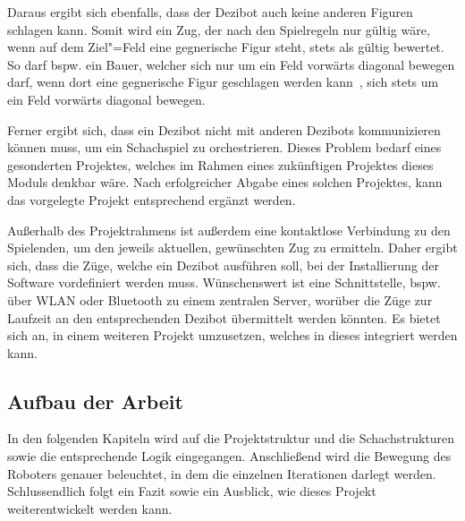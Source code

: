 
Daraus ergibt sich ebenfalls, dass der Dezibot auch keine anderen Figuren schlagen kann. Somit wird ein Zug, der nach den Spielregeln nur gültig wäre, wenn auf dem Ziel"=Feld eine gegnerische Figur steht, stets als gültig bewertet. So darf bspw. ein Bauer, welcher sich nur um ein Feld vorwärts diagonal bewegen darf, wenn dort eine gegnerische Figur geschlagen werden kann~\cite{justUSChessFederations2019}, sich stets um ein Feld vorwärts diagonal bewegen.


Ferner ergibt sich, dass ein Dezibot nicht mit anderen Dezibots kommunizieren können muss, um ein Schachspiel zu orchestrieren. Dieses Problem bedarf eines gesonderten Projektes, welches im Rahmen eines zukünftigen Projektes dieses Moduls denkbar wäre. Nach erfolgreicher Abgabe eines solchen Projektes, kann das vorgelegte Projekt entsprechend ergänzt werden.


Außerhalb des Projektrahmens ist außerdem eine kontaktlose Verbindung zu den Spielenden, um den jeweils aktuellen, gewünschten Zug zu ermitteln. Daher ergibt sich, dass die Züge, welche ein Dezibot ausführen soll, bei der Installierung der Software vordefiniert werden muss. Wünschenswert ist eine Schnittstelle, bspw. über WLAN oder Bluetooth zu einem zentralen Server, worüber die Züge zur Laufzeit an den entsprechenden Dezibot übermittelt werden könnten. Es bietet sich an, in einem weiteren Projekt umzusetzen, welches in dieses integriert werden kann.


\subsection{Aufbau der Arbeit}

In den folgenden Kapiteln wird auf die Projektstruktur und die Schachstrukturen sowie die entsprechende Logik eingegangen. Anschließend wird die Bewegung des Roboters genauer beleuchtet, in dem die einzelnen Iterationen darlegt werden. Schlussendlich folgt ein Fazit sowie ein Ausblick, wie dieses Projekt weiterentwickelt werden kann.
